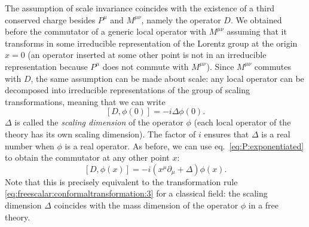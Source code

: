 \documentclass[a4paper,12pt]{article}
\numberwithin{equation}{section}
\begin{document}
The assumption of scale invariance coincides with the existence of a third conserved charge besides $P^\mu$ and $M^{\mu\nu}$, namely the operator $D$.
We obtained before the commutator of a generic local operator with $M^{\mu\nu}$ assuming that it transforms in some irreducible representation of the Lorentz group at the origin $x = 0$
(an operator inserted at some other point is not in an irreducible representation because $P^\mu$ does not commute with $M^{\mu\nu}$).
Since $M^{\mu\nu}$ commutes with $D$, the same assumption can be made about scale: any local operator can be decomposed into irreducible representations of the group of scaling transformations, meaning that we can write
\begin{equation}
	\left[ D, \phi(0) \right] = -i \Delta \phi(0).
\end{equation}
$\Delta$ is called the \emph{scaling dimension} of the operator $\phi$ (each local operator of the theory has its own scaling dimension).
The factor of $i$ ensures that $\Delta$ is a real number when $\phi$ is a real operator.
As before, we can use eq.~\eqref{eq:P:exponentiated} to obtain the commutator at any other point $x$:
\begin{equation}
	\left[ D, \phi(x) \right]
	= -i \left( x^\mu \partial_\mu + \Delta \right) \phi(x).
	\label{eq:commutator:D}
\end{equation}
Note that this is precisely equivalent to the transformation rule \eqref{eq:freescalar:conformaltransformation:3} for a classical field:
the scaling dimension $\Delta$ coincides with the mass dimension of the operator $\phi$ in a free theory.
\end{document}
